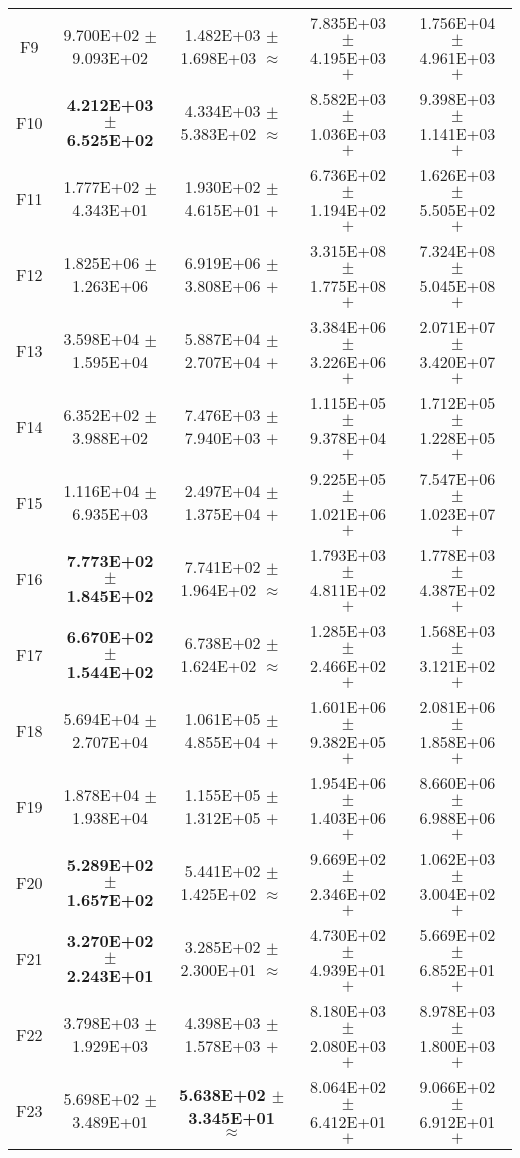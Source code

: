 \documentclass[paper]{ieice}
\begin{document}
\begin{table*}[htbp]
\begin{tabular}{c|c|c|c|c}
		F9	&	9.700E+02	$\pm$	9.093E+02		&	1.482E+03	$\pm$	1.698E+03	$\approx$	&	7.835E+03	$\pm$	4.195E+03	$+$	&	1.756E+04	$\pm$	4.961E+03	$+$	\\
		F10	&	\textbf{4.212E+03	$\pm$	6.525E+02}		&	4.334E+03	$\pm$	5.383E+02	$\approx$	&	8.582E+03	$\pm$	1.036E+03	$+$	&	9.398E+03	$\pm$	1.141E+03	$+$	\\
		F11	&	1.777E+02	$\pm$	4.343E+01		&	1.930E+02	$\pm$	4.615E+01	$+$	&	6.736E+02	$\pm$	1.194E+02	$+$	&	1.626E+03	$\pm$	5.505E+02	$+$	\\
		F12	&	1.825E+06	$\pm$	1.263E+06		&	6.919E+06	$\pm$	3.808E+06	$+$	&	3.315E+08	$\pm$	1.775E+08	$+$	&	7.324E+08	$\pm$	5.045E+08	$+$	\\
		F13	&	3.598E+04	$\pm$	1.595E+04		&	5.887E+04	$\pm$	2.707E+04	$+$	&	3.384E+06	$\pm$	3.226E+06	$+$	&	2.071E+07	$\pm$	3.420E+07	$+$	\\
		F14	&	6.352E+02	$\pm$	3.988E+02		&	7.476E+03	$\pm$	7.940E+03	$+$	&	1.115E+05	$\pm$	9.378E+04	$+$	&	1.712E+05	$\pm$	1.228E+05	$+$	\\
		F15	&	1.116E+04	$\pm$	6.935E+03		&	2.497E+04	$\pm$	1.375E+04	$+$	&	9.225E+05	$\pm$	1.021E+06	$+$	&	7.547E+06	$\pm$	1.023E+07	$+$	\\
		F16	&	\textbf{7.773E+02	$\pm$	1.845E+02}		&	7.741E+02	$\pm$	1.964E+02	$\approx$	&	1.793E+03	$\pm$	4.811E+02	$+$	&	1.778E+03	$\pm$	4.387E+02	$+$	\\
		F17	&	\textbf{6.670E+02	$\pm$	1.544E+02}		&	6.738E+02	$\pm$	1.624E+02	$\approx$	&	1.285E+03	$\pm$	2.466E+02	$+$	&	1.568E+03	$\pm$	3.121E+02	$+$	\\
		F18	&	5.694E+04	$\pm$	2.707E+04		&	1.061E+05	$\pm$	4.855E+04	$+$	&	1.601E+06	$\pm$	9.382E+05	$+$	&	2.081E+06	$\pm$	1.858E+06	$+$	\\
		F19	&	1.878E+04	$\pm$	1.938E+04		&	1.155E+05	$\pm$	1.312E+05	$+$	&	1.954E+06	$\pm$	1.403E+06	$+$	&	8.660E+06	$\pm$	6.988E+06	$+$	\\
		F20	&	\textbf{5.289E+02	$\pm$	1.657E+02}		&	5.441E+02	$\pm$	1.425E+02	$\approx$	&	9.669E+02	$\pm$	2.346E+02	$+$	&	1.062E+03	$\pm$	3.004E+02	$+$	\\
		F21	&	\textbf{3.270E+02	$\pm$	2.243E+01}		&	3.285E+02	$\pm$	2.300E+01	$\approx$	&	4.730E+02	$\pm$	4.939E+01	$+$	&	5.669E+02	$\pm$	6.852E+01	$+$	\\
		F22	&	3.798E+03	$\pm$	1.929E+03		&	4.398E+03	$\pm$	1.578E+03	$+$	&	8.180E+03	$\pm$	2.080E+03	$+$	&	8.978E+03	$\pm$	1.800E+03	$+$	\\
		F23	&	5.698E+02	$\pm$	3.489E+01		&	\textbf{5.638E+02	$\pm$	3.345E+01}	$\approx$	&	8.064E+02	$\pm$	6.412E+01	$+$	&	9.066E+02	$\pm$	6.912E+01	$+$	\\

\end{tabular}
\end{table*}
\end{document}
